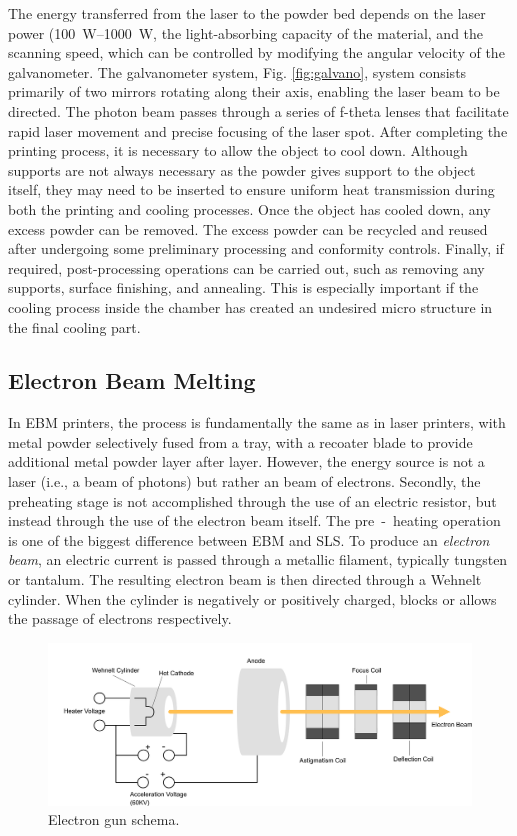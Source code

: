 The energy transferred from the laser to the powder bed depends on the laser power (\SIrange[range-phrase = --]{100}{1000}{\watt}, the light-absorbing capacity of the material, and the scanning speed, which can be controlled by modifying the angular velocity of the galvanometer. The galvanometer system, Fig. \ref{fig:galvano}, system consists primarily of two mirrors rotating along their axis, enabling the laser beam to be directed. The photon beam passes through a series of f-theta lenses that facilitate rapid laser movement and precise focusing of the laser spot. After completing the printing process, it is necessary to allow the object to cool down. Although supports are not always necessary as the powder gives support to the object itself, they may need to be inserted to ensure uniform heat transmission during both the printing and cooling processes. Once the object has cooled down, any excess powder can be removed. The excess powder can be recycled and reused after undergoing some preliminary processing and conformity controls. Finally, if required, post-processing operations can be carried out, such as removing any supports, surface finishing, and annealing. This is especially important if the cooling process inside the chamber has created an undesired micro structure in the final cooling part.

\subsection{Electron Beam Melting}
\label{subsec:ebm}
In EBM printers, the process is fundamentally the same as in laser printers, with metal powder selectively fused from a tray, with a recoater blade to provide additional metal powder layer after layer. However, the energy source is not a laser (i.e., a beam of photons) but rather an beam of electrons. Secondly, the preheating stage is not accomplished through the use of an electric resistor, but instead through the use of the electron beam itself. The pre~-~heating operation is one of the biggest difference between EBM and SLS. To produce an \emph{electron beam}, an electric current is passed through a metallic filament, typically tungsten or tantalum. The resulting electron beam is then directed through a Wehnelt cylinder. When the cylinder is negatively or positively charged, blocks or allows the passage of electrons respectively.

\begin{figure}
    \centering
    \includegraphics[scale=0.5]{Images/EBM.png}
    \caption[Electron gun schema.]{Electron gun schema.}
    \label{fig:electrongun}
\end{figure}

